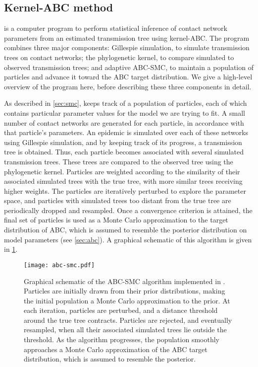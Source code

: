 \subsection{Kernel-ABC method}

 is a computer program to perform statistical inference of
contact network parameters from an estimated transmission tree using
kernel-\gls{ABC}. The program combines three major components: Gillespie
simulation, to simulate transmission trees on contact networks; the
phylogenetic kernel, to compare simulated to observed transmission trees; and
adaptive \gls{ABC}-\gls{SMC}, to maintain a population of particles and advance
it toward the \gls{ABC} target distribution. We give a high-level overview of
the program here, before describing these three components in detail.

As described in \cref{sec:smc},  keeps track of a population
of particles, each of which contains particular parameter values for the model
we are trying to fit. A small number of contact networks are generated for each
particle, in accordance with that particle's parameters. An epidemic is
simulated over each of these networks using Gillespie simulation, and by
keeping track of its progress, a transmission tree is obtained. Thus, each
particle becomes associated with several simulated transmission trees.  These
trees are compared to the observed tree using the phylogenetic kernel.
Particles are weighted according to the similarity of their associated
simulated trees with the true tree, with more similar trees receiving higher
weights. The particles are iteratively perturbed to explore the parameter
space, and particles with simulated trees too distant from the true tree are
periodically dropped and resampled. Once a convergence criterion is attained,
the final set of particles is used as a Monte Carlo approximation to the target
distribution of \gls{ABC}, which is assumed to resemble the posterior
distribution on model parameters (see \cref{sec:abc}). A graphical schematic of
this algorithm is given in \cref{fig:abcsmc}.

\begin{figure}
    \texttt{[image: abc-smc.pdf]}
    \caption[Graphical schematic of \gls{ABC}-\gls{SMC} algorithm.]{
      Graphical schematic of the \gls{ABC}-\gls{SMC} algorithm implemented in
      . Particles are initially drawn from their prior
      distributions, making the initial population a Monte Carlo approximation
      to the prior. At each iteration, particles are perturbed, and a distance
      threshold around the true tree contracts. Particles are rejected, and
      eventually resampled, when all their associated simulated trees lie
      outside the threshold. As the algorithm progresses, the population
      smoothly approaches a Monte Carlo approximation of the \gls{ABC} target
      distribution, which is assumed to resemble the posterior.
    }
    \label{fig:abcsmc}
\end{figure}

